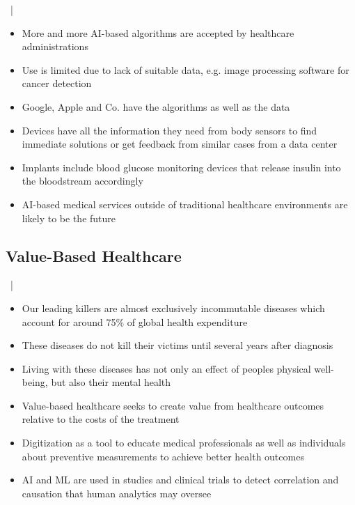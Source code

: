 \documentclass[xcolor=dvipsnames, aspectratio=1610]{beamer}
\begin{document}
\begin{frame}{\secname\ | \subsecname}
    \begin{itemize}[<+->]
        \item More and more AI-based algorithms are accepted by healthcare administrations \cite{fdaAi}
        \item Use is limited due to lack of suitable data, e.g. image processing software for cancer detection \cite{kiKroenung}
        \item Google, Apple and Co. have the algorithms as well as the data
        \item Devices have all the information they need from body sensors to find immediate solutions or get feedback from similar cases from a data center \cite{kiKroenung}
        \item Implants include blood glucose monitoring devices that release insulin into the bloodstream accordingly \cite{rege2017development}
        \item AI-based medical services outside of traditional healthcare environments are likely to be the future
    \end{itemize}
\end{frame}


\subsection{Value-Based Healthcare}%
\label{sub:value_based_healthcare}

\begin{frame}{\secname\ | \subsecname}
    \begin{itemize}[<+->]
        \item Our leading killers are almost exclusively incommutable diseases which account for around 75\% of global health expenditure \cite{tsiachristas2016financial}
        \item These diseases do not kill their victims until several years after diagnosis
        \item Living with these diseases has not only an effect of peoples physical well-being, but also their mental health
        \item Value-based healthcare seeks to create value from healthcare outcomes relative to the costs of the treatment \cite{putera2017redefining}
        \item Digitization as a tool to educate medical professionals as well as individuals about preventive measurements to achieve better health outcomes
        \item AI and ML are used in studies and clinical trials to detect correlation and causation that human analytics may oversee \cite{rehme2014identifying}
    \end{itemize}
\end{frame}
\end{document}
